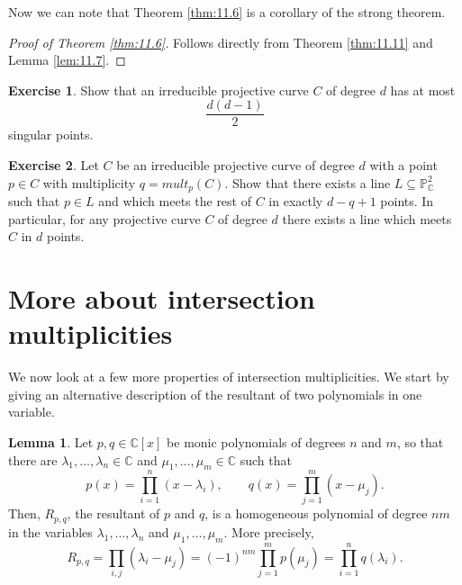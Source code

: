 \documentclass{article}
\newcommand{\C}{\mathbb{C}}
\renewcommand{\P}{\mathbb{P}}
\newcommand{\rb}[1]{\left( #1 \right)}
\renewcommand{\sb}[1]{\left[ #1 \right]}
\theoremstyle{definition}\newtheorem{definition}{Definition}[section]
\theoremstyle{definition}\newtheorem{notation}[definition]{Notation}
\theoremstyle{definition}\newtheorem{remark}[definition]{Remark}
\theoremstyle{definition}\newtheorem{example1}[definition]{Example}
\theoremstyle{definition}\newtheorem{fact}{Fact}
\theoremstyle{definition}\newtheorem{exercise}{Exercise}
\theoremstyle{definition}\newtheorem*{example2}{Example}
\newtheorem{lemma}[definition]{Lemma}
\begin{document}
Now we can note that Theorem \ref{thm:11.6} is a corollary of the strong theorem.

\begin{proof}[Proof of Theorem \ref{thm:11.6}]
Follows directly from Theorem \ref{thm:11.11} and Lemma \ref{lem:11.7}.
\end{proof}

\begin{exercise}
Show that an irreducible projective curve $ C $ of degree $ d $ has at most
$$ \dfrac{d\rb{d - 1}}{2} $$
singular points.
\end{exercise}

\begin{exercise}
Let $ C $ be an irreducible projective curve of degree $ d $ with a point $ p \in C $ with multiplicity $ q = mult_p\rb{C} $. Show that there exists a line $ L \subseteq \P_\C^2 $ such that $ p \in L $ and which meets the rest of $ C $ in exactly $ d - q + 1 $ points. In particular, for any projective curve $ C $ of degree $ d $ there exists a line which meets $ C $ in $ d $ points.
\end{exercise}

\pagebreak

\section{More about intersection multiplicities}

We now look at a few more properties of intersection multiplicities. We start by giving an alternative description of the resultant of two polynomials in one variable.

\begin{lemma}
\label{lem:12.1}
Let $ p, q \in \C\sb{x} $ be monic polynomials of degrees $ n $ and $ m $, so that there are $ \lambda_1, \dots, \lambda_n \in \C $ and $ \mu_1, \dots, \mu_m  \in \C $ such that
$$ p\rb{x} = \prod_{i = 1}^n \rb{x - \lambda_i}, \qquad q\rb{x} = \prod_{j = 1}^m \rb{x - \mu_j}. $$
Then, $ R_{p, q} $, the resultant of $ p $ and $ q $, is a homogeneous polynomial of degree $ nm $ in the variables $ \lambda_1, \dots, \lambda_n $ and $ \mu_1, \dots, \mu_m $. More precisely,
$$ R_{p, q} = \prod_{i, j}\rb{\lambda_i - \mu_j} = \rb{-1}^{nm}\prod_{j = 1}^m p\rb{\mu_j} = \prod_{i = 1}^n q\rb{\lambda_i}. $$
\end{lemma}
\end{document}
